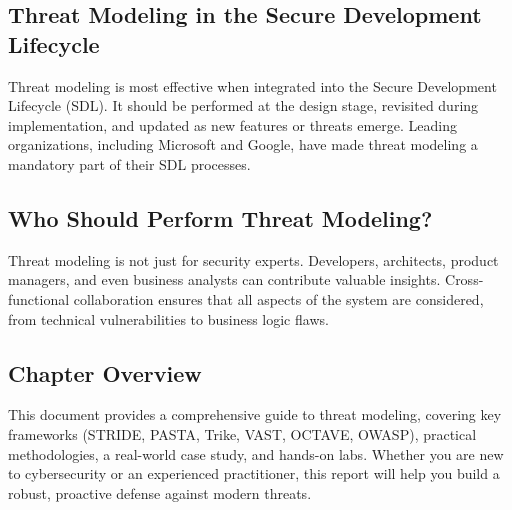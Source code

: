 \subsection*{Threat Modeling in the Secure Development Lifecycle}
Threat modeling is most effective when integrated into the Secure Development Lifecycle (SDL). It should be performed at the design stage, revisited during implementation, and updated as new features or threats emerge. Leading organizations, including Microsoft and Google, have made threat modeling a mandatory part of their SDL processes.

\subsection*{Who Should Perform Threat Modeling?}
Threat modeling is not just for security experts. Developers, architects, product managers, and even business analysts can contribute valuable insights. Cross-functional collaboration ensures that all aspects of the system are considered, from technical vulnerabilities to business logic flaws.

\subsection*{Chapter Overview}
This document provides a comprehensive guide to threat modeling, covering key frameworks (STRIDE, PASTA, Trike, VAST, OCTAVE, OWASP), practical methodologies, a real-world case study, and hands-on labs. Whether you are new to cybersecurity or an experienced practitioner, this report will help you build a robust, proactive defense against modern threats.
